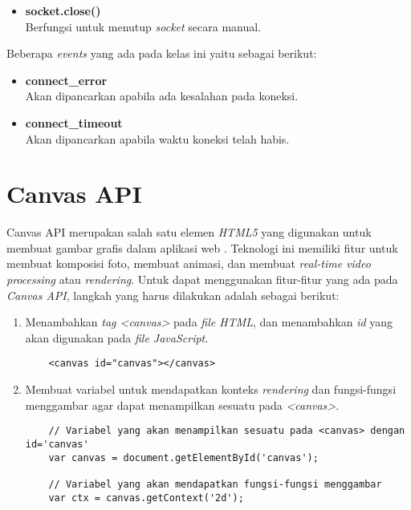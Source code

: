 \begin{enumerate}
\begin{itemize}
	\item \textbf{socket.close()} \\ Berfungsi untuk menutup \textit{socket} secara manual.
	\end{itemize}

	Beberapa \textit{events} yang ada pada kelas ini yaitu sebagai berikut:
	\begin{itemize}
		\item \textbf{connect\_error} \\ Akan dipancarkan apabila ada kesalahan pada koneksi.
		\item \textbf{connect\_timeout} \\ Akan dipancarkan apabila waktu koneksi telah habis.
	\end{itemize}
\end{enumerate} 


 

\section{Canvas API}
\label{sec:Canvas API}
 
Canvas API merupakan salah satu elemen \textit{HTML5} yang digunakan untuk membuat gambar grafis dalam aplikasi web \cite{canvas}. Teknologi ini memiliki fitur untuk membuat komposisi foto, membuat animasi, dan membuat \textit{real-time video processing} atau \textit{rendering}. Untuk dapat menggunakan fitur-fitur yang ada pada \textit{Canvas API}, langkah yang harus dilakukan adalah sebagai berikut:
\begin{enumerate}
	\item Menambahkan \textit{tag <canvas>} pada \textit{file HTML}, dan menambahkan \textit{id} yang akan digunakan pada \textit{file JavaScript}.
	\begin{lstlisting}
	<canvas id="canvas"></canvas>
	\end{lstlisting}
	
	\item Membuat variabel untuk mendapatkan konteks \textit{rendering} dan fungsi-fungsi menggambar agar dapat menampilkan sesuatu pada \textit{<canvas>}.
	\begin{lstlisting}
	// Variabel yang akan menampilkan sesuatu pada <canvas> dengan id='canvas'
	var canvas = document.getElementById('canvas'); 
	
	// Variabel yang akan mendapatkan fungsi-fungsi menggambar 
	var ctx = canvas.getContext('2d');
	\end{lstlisting}
\end{enumerate}

